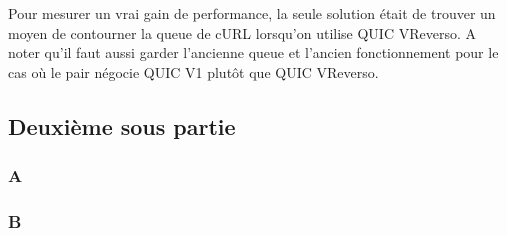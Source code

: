 Pour mesurer un vrai gain de performance, la seule solution était de trouver un moyen de contourner la queue de cURL lorsqu'on utilise QUIC VReverso. A noter qu'il faut aussi garder l'ancienne queue et l'ancien fonctionnement pour le cas où le pair négocie QUIC V1 plutôt que QUIC VReverso.

\newpage

\subsection{Deuxième sous partie}

\subsubsection{A}

    \lipsum[1-2]

\subsubsection{B}

    \lipsum[1-2]